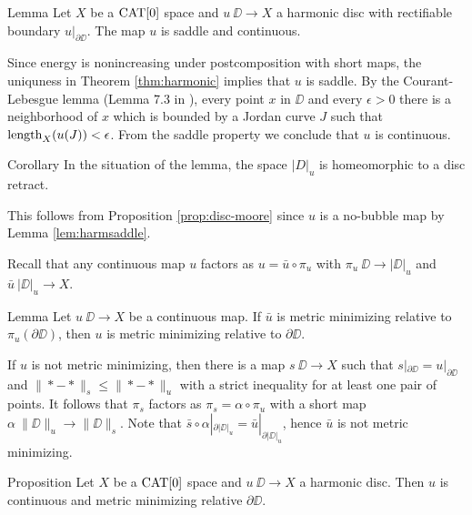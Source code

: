 \documentclass[a4paper,10pt]{amsart}
\begin{document}
\begin{thm}{Lemma}\label{lem:harmsaddle}
Let $X$ be a $\mathop{\rm CAT}\nolimits[0]$ space and
$u\:\DD\to X$ a harmonic disc with rectifiable boundary $u|_{\partial \DD}$.
The map $u$ is saddle and continuous.
\end{thm}

Since energy is nonincreasing under postcomposition with short maps, the uniquness in Theorem \ref{thm:harmonic} implies that
$u$ is saddle. By the Courant-Lebesgue lemma (Lemma 7.3 in \cite{LW}), every point $x$ in $\DD$ and every $\epsilon>0$
there is a neighborhood of $x$ which is bounded by a Jordan curve $J$ such that $\mathop{\rm length}\nolimits_X(u(J))<\epsilon$. From the saddle property we conclude 
that $u$ is continuous.
\qeds

\begin{thm}{Corollary}\label{cor:harmdiscretract}
In the situation of the lemma, the space $|D|_u$ is homeomorphic to a disc retract.
\end{thm}
This follows from Proposition \ref{prop:disc-moore} since $u$ is a no-bubble map by Lemma \ref{lem:harmsaddle}.
\qeds

Recall that any continuous map $u$ factors as $u=\bar u\circ \pi_u$ with $\pi_u\:\DD\to|\DD|_u$ and $\bar u\:|\DD|_u\to X$.


\begin{thm}{Lemma}\label{lem:memicrit}
Let $u\:\DD\to X$ be a continuous map. 
If $\bar u$ is metric minimizing relative to $\pi_u(\partial\DD)$, then $u$ is metric minimizing relative to $\partial\DD$.
\end{thm}

If $u$ is not metric minimizing, then there is a map $s\:\DD\to X$ such that $s|_{\partial\DD}=u|_{\partial\DD}$ and $\|*-*\|_s\leq \|*-*\|_u$
with a strict inequality for at least one pair of points. It follows that $\pi_s$ factors as $\pi_s=\alpha\circ\pi_u$ with a short  map $\alpha\:\|\DD\|_u\to\|\DD\|_s$.
Note that $\bar s\circ\alpha|_{\partial|\DD|_u}=\bar u|_{\partial|\DD|_u}$, hence $\bar u$ is not metric minimizing.
\qeds







 \begin{thm}{Proposition}\label{prop:harmonic}
Let $X$ be a $\mathop{\rm CAT}\nolimits[0]$ space 
and $u\:\DD\to X$ a harmonic disc.
Then $u$ is continuous and metric minimizing relative $\partial\DD$.
\end{thm}
\end{document}
